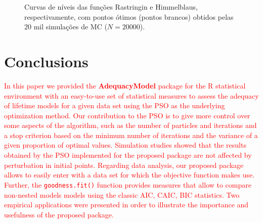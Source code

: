 \documentclass[10pt,letterpaper]{article}
\begin{document}
\begin{figure}[H]
	\centering
	
	\caption{Curvas de níveis das funções Rastringin e Himmelblaus, respectivamente, com pontos ótimos (pontos brancos) obtidos pelas 20 mil  simulações de MC ($N = 20000$).}
\end{figure}




\section{Conclusions}

\textcolor{red}{In this paper we provided the \textbf{AdequacyModel} package for the \textsc{R} statistical environment with an easy-to-use set of statistical measures to assess the adequacy of lifetime models for a given data set using the PSO as the underlying optimization method. Our contribution to the PSO is to give more control over some aspects of the algorithm, such as the number of particles and iterations and a stop criterion based on the minimum number of iterations and the variance of a given proportion of optimal values. Simulation studies showed that the results obtained by the PSO implemented for the proposed package are not affected by perturbation in initial points. Regarding data analysis, our proposed package allows to easily enter with a data set for which the objective function makes use. Further, the \texttt{goodness.fit()} function provides measures that allow to compare non-nested models models using the classic AIC, CAIC, BIC statistics. Two empirical applications were presented in order to illustrate the importance and usefulness of the proposed package.}
\end{document}
